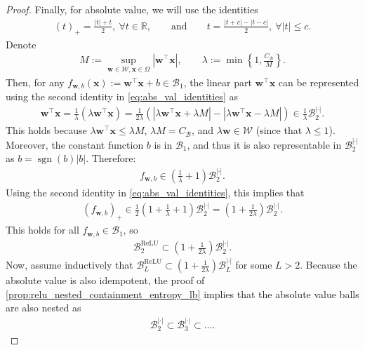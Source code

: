 \documentclass{article}
\DeclareMathOperator{\ReLU}{\mathrm{ReLU}}
\DeclareMathOperator{\sgn}{sgn}
\def\vw{{\bm{w}}}
\def\vx{{\bm{x}}}
\def\cB{{\mathcal{B}}}
\def\cW{{\mathcal{W}}}
\newcommand{\R}{\mathbb{R}}
\begin{document}
\begin{appendices}
\begin{proof}
    Finally, for absolute value, we will use the identities
    \begin{align} \label{eq:abs_val_identities}
        (t)_+ = \frac{|t| + t}{2}, \ \forall t \in \R, \qquad \textrm{and} \qquad t = \frac{|t+c|-|t-c|}{2}, \ \forall |t| \leq c.
    \end{align}
    Denote
    \begin{align}
        M := \sup_{\vw \in \cW, \vx \in \Omega} | \vw^\top \vx|, \qquad \lambda := \min \left\{ 1, \frac{C_{\cB}}{M} \right\}.
    \end{align}
    Then, for any $f_{\vw,b}(\vx) := \vw^\top \vx + b \in \cB_1$, the linear part $\vw^\top \vx$ can be represented using the second identity in \eqref{eq:abs_val_identities} as
    \begin{align} \label{eq:linear_part_abs_rep}
        \vw^\top \vx = \frac{1}{\lambda} (\lambda \vw^\top \vx) = \frac{1}{2 \lambda} \left( | \lambda \vw^\top \vx + \lambda M| -  | \lambda \vw^\top \vx - \lambda M|\right) \in \frac{1}{\lambda} \cB_2^{|\cdot|}.
    \end{align}
    This holds because  $\lambda \vw^\top \vx \leq \lambda M$, $\lambda M = C_{\cB}$, and $\lambda \vw \in \cW$ (since that $\lambda \leq 1$). Moreover, the constant function $b$ is in $\cB_1$, and thus it is also representable in $\cB_2^{|\cdot|}$ as $b = \sgn(b) |b|$. Therefore:
    \begin{align}
        f_{\vw,b} \in \left( \frac{1}{\lambda} + 1 \right)\cB_2^{|\cdot|}.
    \end{align}
    Using the second identity in \eqref{eq:abs_val_identities}, this implies that
    \begin{align}
        (f_{\vw,b})_+ \in \frac{1}{2} \left(1 + \frac{1}{\lambda} + 1 \right) \cB_2^{|\cdot|} = \left( 1 + \frac{1}{2 \lambda} \right) \cB_2^{|\cdot|}.
    \end{align}
    This holds for all $f_{\vw,b} \in \cB_1$, so
    \begin{align}
        \cB_2^{\ReLU} \subset \left( 1 + \frac{1}{2 \lambda} \right) \cB_2^{|\cdot|}. 
    \end{align}
    Now, assume inductively that $\cB_L^{\ReLU} \subset \left(1 + \frac{1}{2 \lambda} \right) \cB_L^{|\cdot|}$ for some $L > 2$. Because the absolute value is also idempotent, the proof of \cref{prop:relu_nested_containment_entropy_lb} implies that the absolute value balls are also nested as
    \begin{align}
        \cB_2^{|\cdot|} \subset \cB_3^{|\cdot|} \subset \dots.

\end{align}
\end{proof}
\end{appendices}
\end{document}
